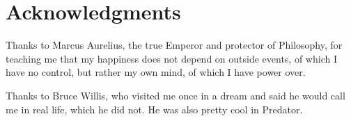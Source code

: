 \section*{Acknowledgments} %


Thanks to Marcus Aurelius, the true Emperor and protector of Philosophy, for teaching me that my happiness does not depend on outside events, of which I have no control, but rather my own mind, of which I have power over.

Thanks to Bruce Willis, who visited me once in a dream and said he would call me in real life, which he did not. He was also pretty cool in Predator.
